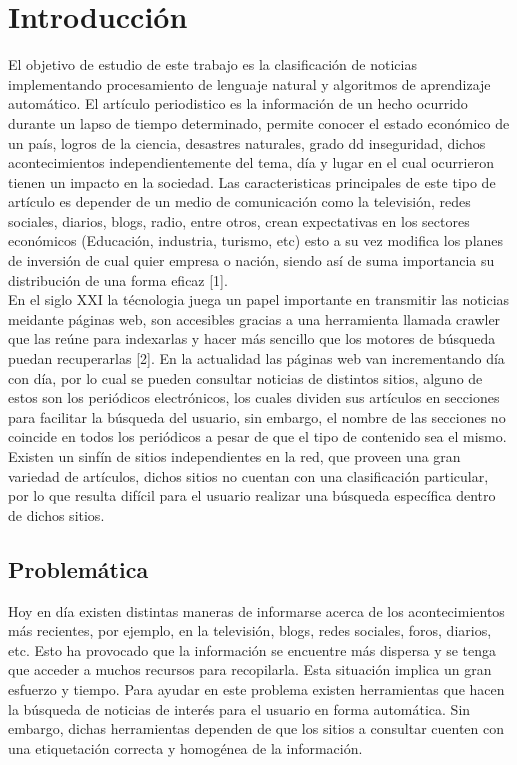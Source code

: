 
\chapter{Introducción}\label{chp:introduccion}

El objetivo de estudio de este trabajo es la clasificación de noticias implementando 
procesamiento de lenguaje natural y algoritmos de aprendizaje automático. El artículo periodistico es la información de un hecho ocurrido durante un lapso de tiempo determinado, permite conocer el estado económico de un país, logros de la ciencia, desastres naturales, grado dd inseguridad, dichos acontecimientos independientemente del tema, día y lugar en el cual ocurrieron tienen un impacto en la sociedad. Las caracteristicas principales de este tipo de artículo es depender de un medio de comunicación como la televisión, redes sociales, diarios, blogs, radio, entre otros, crean expectativas en los sectores económicos (Educación, industria, turismo, etc) esto a su vez modifica los planes de inversión de cual quier empresa o nación, siendo así de suma importancia su distribución de una forma eficaz [1].\\

En el siglo XXI la técnologia juega un papel importante en transmitir las noticias meidante páginas web, son accesibles gracias a una herramienta llamada crawler que las reúne para indexarlas y hacer más sencillo que los motores de búsqueda puedan recuperarlas [2]. En la actualidad las páginas web van incrementando día con día, por lo cual se pueden consultar noticias de distintos sitios, alguno de estos son los periódicos electrónicos, los cuales dividen sus artículos en secciones para facilitar la búsqueda del usuario, sin embargo, el nombre de las secciones no coincide en todos los periódicos a pesar de que el tipo de contenido sea el mismo. Existen un sinfín de sitios independientes en la red, que proveen una gran variedad de artículos, dichos sitios no cuentan con una clasificación particular, por lo que resulta difícil para el usuario realizar una búsqueda específica dentro de dichos sitios.


\section{Problemática}

Hoy en día existen distintas maneras de informarse acerca de los acontecimientos más recientes, por ejemplo, en la televisión, blogs, redes sociales, foros, diarios, etc. Esto ha provocado que la información se encuentre más dispersa y se tenga que acceder a muchos recursos para recopilarla. Esta situación implica un gran esfuerzo y tiempo. Para ayudar en este problema existen herramientas que hacen la búsqueda de noticias de interés para el usuario en forma automática. Sin embargo, dichas herramientas dependen de que los sitios a consultar cuenten con una etiquetación correcta y homogénea de la información.\\

